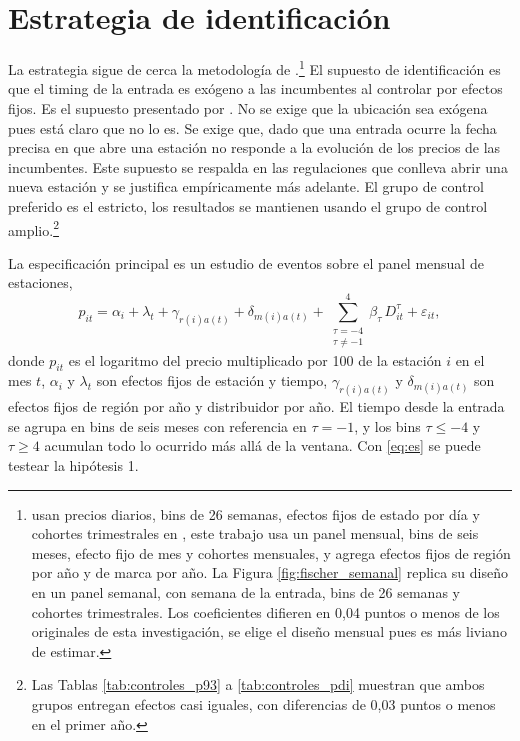 \section{Estrategia de identificación} \label{sec:identificacion}

La estrategia sigue de cerca la metodología de \textcite{FISCHER2025}.\footnote{\textcite{FISCHER2025} usan precios diarios, bins de 26 semanas, efectos fijos de estado por día y cohortes trimestrales en \textcite{SUNABRAHAM2021}, este trabajo usa un panel mensual, bins de seis meses, efecto fijo de mes y cohortes mensuales, y agrega efectos fijos de región por año y de marca por año. La Figura \ref{fig:fischer_semanal} replica su diseño en un panel semanal, con semana de la entrada, bins de 26 semanas y cohortes trimestrales. Los coeficientes difieren en 0,04 puntos o menos de los originales de esta investigación, se elige el diseño mensual pues es más liviano de estimar.} El supuesto de identificación es que el timing de la entrada es exógeno a las incumbentes al controlar por efectos fijos. Es el supuesto presentado por \textcite{ARCIDIACONO2020}. No se exige que la ubicación sea exógena pues está claro que no lo es. Se exige que, dado que una entrada ocurre la fecha precisa en que abre una estación no responde a la evolución de los precios de las incumbentes. Este supuesto se respalda en las regulaciones que conlleva abrir una nueva estación y se justifica empíricamente más adelante. El grupo de control preferido es el estricto, los resultados se mantienen usando el grupo de control amplio.\footnote{Las Tablas \ref{tab:controles_p93} a \ref{tab:controles_pdi} muestran que ambos grupos entregan efectos casi iguales, con diferencias de 0,03 puntos o menos en el primer año.}

La especificación principal es un estudio de eventos sobre el panel mensual de estaciones, 
\begin{equation}
    p_{it} = \alpha_i + \lambda_t + \gamma_{r(i)a(t)} + \delta_{m(i)a(t)}
             + \sum_{\substack{\tau=-4 \\ \tau \neq -1}}^{4}
               \beta_\tau \, D^{\tau}_{it} + \varepsilon_{it},
    \label{eq:es}
\end{equation}
donde $p_{it}$ es el logaritmo del precio multiplicado por 100 de la estación $i$ en el mes $t$, $\alpha_i$ y $\lambda_t$ son efectos fijos de estación y tiempo, $\gamma_{r(i)a(t)}$ y $\delta_{m(i)a(t)}$ son efectos fijos de región por año y distribuidor por año. El tiempo desde la entrada se agrupa en bins de seis meses con referencia en $\tau = -1$, y los bins $\tau\leq -4$ y $\tau \geq 4$ acumulan todo lo ocurrido más allá de la ventana. Con \eqref{eq:es} se puede testear la hipótesis 1. 

